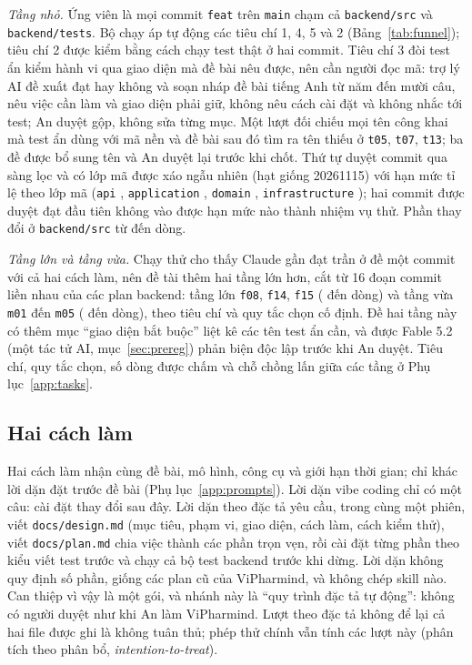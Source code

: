 \textit{Tầng nhỏ.} Ứng viên là mọi commit \texttt{feat} trên \texttt{main} chạm cả \texttt{backend/src} và
\texttt{backend/tests}. Bộ chạy áp tự động các tiêu chí 1, 4, 5 và 2 (Bảng~\ref{tab:funnel}); tiêu chí 2 được
kiểm bằng cách chạy test thật ở hai commit. Tiêu chí 3 đòi test ẩn kiểm hành vi qua giao diện mà đề bài nêu
được, nên cần người đọc mã: trợ lý AI đề xuất đạt hay không và soạn nháp đề bài tiếng Anh từ năm đến mười
câu, nêu việc cần làm và giao diện phải giữ, không nêu cách cài đặt và không nhắc tới test; An duyệt gộp,
không sửa từng mục. Một lượt đối chiếu mọi tên công khai mà test ẩn dùng với mã nền và đề bài sau đó tìm ra
tên thiếu ở \texttt{t05}, \texttt{t07}, \texttt{t13}; ba đề được bổ sung tên và An duyệt lại trước khi chốt.
Thứ tự duyệt \NumEligibleStratifiable{} commit qua sàng lọc và có lớp mã được xáo ngẫu nhiên (hạt giống 20261115) với hạn mức tỉ
lệ theo lớp mã (\texttt{api} \NumTasksApi{}, \texttt{application} \NumTasksApplication{}, \texttt{domain}
\NumTasksDomain{}, \texttt{infrastructure} \NumTasksInfrastructure{}); hai commit được duyệt đạt đầu tiên không vào
được hạn mức nào thành \NumPilotTasks{} nhiệm vụ thử. Phần thay đổi ở \texttt{backend/src} từ
\NumTaskSrcLinesMin{} đến \NumTaskSrcLinesMax{} dòng.

\textit{Tầng lớn và tầng vừa.} Chạy thử cho thấy Claude gần đạt trần ở đề một commit với cả hai cách làm,
nên đề tài thêm hai tầng lớn hơn, cắt từ 16 đoạn commit liền nhau của các plan backend: tầng lớn
\texttt{f08}, \texttt{f14}, \texttt{f15} (\NumFeatureSrcLinesMin{} đến \NumFeatureSrcLinesMax{} dòng) và tầng
vừa \texttt{m01} đến \texttt{m05} (\NumMediumSrcLinesMin{} đến \NumMediumSrcLinesMax{} dòng), theo tiêu chí
và quy tắc chọn cố định. Đề hai tầng này có thêm mục ``giao diện bắt buộc'' liệt kê các tên test ẩn cần, và
được Fable 5.2 (một tác tử AI, mục~\ref{sec:prereg}) phản biện độc lập trước khi An duyệt. Tiêu chí, quy tắc chọn, số dòng được chấm và chỗ chồng
lấn giữa các tầng ở Phụ lục~\ref{app:tasks}.

\subsection{Hai cách làm}

Hai cách làm nhận cùng đề bài, mô hình, công cụ và giới hạn thời gian; chỉ khác lời dặn đặt trước đề bài
(Phụ lục~\ref{app:prompts}). Lời dặn vibe coding chỉ có một câu: cài đặt thay đổi sau đây. Lời dặn theo đặc
tả yêu cầu, trong cùng một phiên, viết \texttt{docs/design.md} (mục tiêu, phạm vi, giao diện, cách làm, cách
kiểm thử), viết \texttt{docs/plan.md} chia việc thành các phần trọn vẹn, rồi cài đặt từng phần theo kiểu
viết test trước và chạy cả bộ test backend trước khi dừng. Lời dặn không quy định số phần, giống các plan
cũ của ViPharmind, và không chép skill nào. Can thiệp vì vậy là một gói, và nhánh này là ``quy trình đặc
tả tự động'': không có người duyệt như khi An làm ViPharmind. Lượt theo đặc tả không để lại cả hai file
được ghi là không tuân thủ; phép thử chính vẫn tính các lượt này (phân tích theo phân bổ, \emph{intention-to-treat}).

